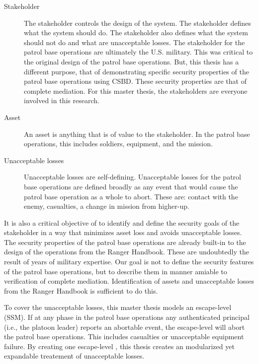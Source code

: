 \documentclass[../../main/main.tex]{subfiles}
\begin{document}
\begin{description}
\item[ Stakeholder]  The stakeholder controls the design of the system.  The stakeholder defines what the system should do.  The stakeholder also defines what the system should not do and what are unacceptable losses.  The stakeholder for the patrol base operations are ultimately the U.S. military.  This was critical to the original design of the patrol base operations.  But, this thesis has a different purpose, that of demonstrating specific security properties of the patrol base operations using CSBD.  These security properties are that of complete mediation.  For this master thesis, the stakeholders are everyone involved in this research.  
\item[Asset] An asset is anything that is of value to the stakeholder.   In the patrol base operations, this includes soldiers, equipment, and the mission.
\item[Unacceptable losses] Unacceptable losses are self-defining.  Unacceptable losses for the patrol base operations are defined broadly as any event that would cause the patrol base operation as a whole to abort.  These are: contact with the enemy, casualties, a change in mission from higher-up.
\end{description}

It is also a critical objective of  to identify and define the security goals of the stakeholder in a way that minimizes asset loss and avoids unacceptable losses.  The security properties of the patrol base operations are already built-in to the design of the operations from the Ranger Handbook.  These are undoubtedly the result of years of military expertise.  Our goal is not to define the security features of the patrol base operations, but to describe them in manner amiable to verification of complete mediation.  Identification of assets and unacceptable losses from the Ranger Handbook is sufficient to do this.

To cover the unacceptable losses, this master thesis models an escape-level  (SSM).  If at any phase in the patrol base operations any authenticated principal (i.e., the platoon leader) reports an abortable event, the escape-level  will abort the patrol base operations. This includes casualties or unacceptable equipment failure.  By creating one escape-level , this thesis creates an modularized yet expandable treatement of unacceptable losses.
\end{document}

